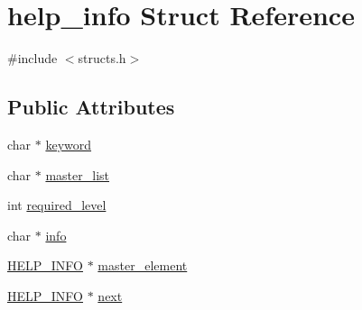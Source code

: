 \hypertarget{structhelp__info}{\section{help\-\_\-info Struct Reference}
\label{structhelp__info}
}


{\ttfamily \#include $<$structs.\-h$>$}

\subsection*{Public Attributes}
\begin{DoxyCompactItemize}
\item 
char $\ast$ \hyperlink{structhelp__info_aac7c41b14f94f94c61268c91cbcad522}{keyword}
\item 
char $\ast$ \hyperlink{structhelp__info_af15d68887c64a3989b2a97c39e592099}{master\-\_\-list}
\item 
int \hyperlink{structhelp__info_aec847b875c832132afb0e132e0126a6b}{required\-\_\-level}
\item 
char $\ast$ \hyperlink{structhelp__info_a7e6e76d90ae4aeb1db48cee1eeee33d8}{info}
\item 
\hyperlink{structs_8h_a8cc626351ce82ff809d3fab66c436149}{H\-E\-L\-P\-\_\-\-I\-N\-F\-O} $\ast$ \hyperlink{structhelp__info_af7c2d49f46dddf86d147fb73571e143f}{master\-\_\-element}
\item 
\hyperlink{structs_8h_a8cc626351ce82ff809d3fab66c436149}{H\-E\-L\-P\-\_\-\-I\-N\-F\-O} $\ast$ \hyperlink{structhelp__info_a9151e388d483f9dfa356c5e3f9f9a714}{next}
\end{DoxyCompactItemize}


